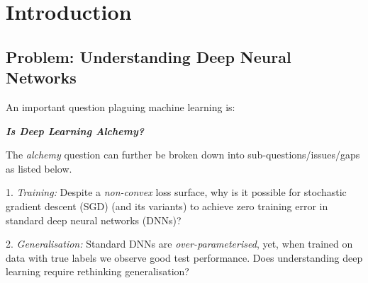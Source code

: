 \documentclass{article}
\begin{document}
\begin{abstract}

\end{abstract}



\section{Introduction}\label{sec:intro}
\subsection{Problem: Understanding Deep Neural Networks}
An important question plaguing machine learning \cite{BenAli-1,Lecun,BenAli-2,Aliresponse,Mickens} is:
\begin{center}
\textbf{\emph{Is Deep Learning Alchemy?}}
\end{center}
The \emph{alchemy} question can further be broken down into sub-questions/issues/gaps as listed below. 

1. \emph{Training:} Despite a \emph{non-convex} loss surface, why is it possible for stochastic gradient descent (SGD) (and its variants) to achieve zero training error in standard deep neural networks (DNNs)?

2. \emph{Generalisation:} Standard DNNs are \emph{over-parameterised}, yet, when trained on data with true labels we observe good test performance. Does understanding deep learning require rethinking generalisation? \cite{ben}
\end{document}
